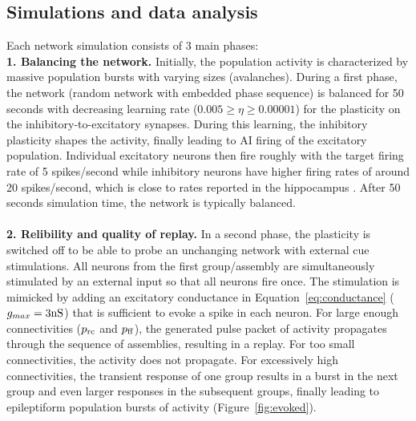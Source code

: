   \subsection{Simulations and data analysis}
    Each network simulation consists of 3 main phases:\\
    \textbf{1. Balancing the network.}
      Initially, the population activity is characterized by massive population bursts with varying sizes (avalanches).
      During a first phase, the network (random network with embedded phase sequence) is balanced for 50 seconds with decreasing learning rate ($0.005 \geq \eta \geq 0.00001$) for the plasticity on the inhibitory-to-excitatory synapses.
      During this learning, the inhibitory plasticity shapes the activity, finally leading to AI firing of the excitatory population.
      Individual excitatory neurons then fire roughly with the target firing rate of 5 spikes/second while inhibitory neurons have higher firing rates of around 20 spikes/second, which is close to rates reported in the hippocampus \citep{Csicsvari2000, Cheng2013}.
      After 50 seconds simulation time, the network is typically balanced.\\\\
    \textbf{2. Relibility and quality of replay.}
      In a second phase, the plasticity is switched off to be able to probe an unchanging network with external cue stimulations.
      All neurons from the first group/assembly are simultaneously stimulated by an external input so that all neurons fire once.
      The stimulation is mimicked by adding an excitatory conductance in Equation~\ref{eq:conductance} ($g_{max}= 3 \rm nS$) that is sufficient to evoke a spike in each neuron.
      For large enough connectivities ($p_{\rm rc}$ and $p_{\rm ff}$), the generated pulse packet of activity propagates through the sequence of assemblies, resulting in a replay.
      For too small connectivities, the activity does not propagate.
      For excessively high connectivities, the transient response of one group results in a burst in the next group and even larger responses in the subsequent groups, finally leading to epileptiform population bursts of activity (Figure~\ref{fig:evoked}).

